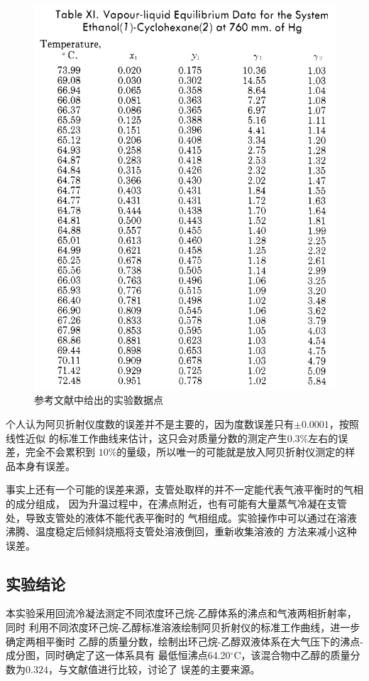 \documentclass[12pt]{article}
\newcommand{\mr}[1]{\mathrm{#1}}
\def\celsius{^{\circ}\mr{C}}  %
\begin{document}
		\begin{figure}
			\centering
			\includegraphics[scale=0.5]{phase_data_paper.png}
			\caption{参考文献\citealt{doi:10.1021/je60019a024}中给出的实验数据点}
			\label{phase data paper}
		\end{figure}
		\par 
		个人认为阿贝折射仪度数的误差并不是主要的，因为度数误差只有$\pm0.0001$，按照线性近似
		的标准工作曲线来估计，这只会对质量分数的测定产生$0.3\%$左右的误差，完全不会累积到
		$10\%$的量级，所以唯一的可能就是放入阿贝折射仪测定的样品本身有误差。
		\par 
		事实上还有一个可能的误差来源，支管处取样的并不一定能代表气液平衡时的气相的成分组成，
		因为升温过程中，在沸点附近，也有可能有大量蒸气冷凝在支管处，导致支管处的液体不能代表平衡时的
		气相组成。实验操作中可以通过在溶液沸腾、温度稳定后倾斜烧瓶将支管处溶液倒回，重新收集溶液的
		方法来减小这种误差。
		\subsection{实验结论}
		本实验采用回流冷凝法测定不同浓度环己烷-乙醇体系的沸点和气液两相折射率，同时
		利用不同浓度环己烷-乙醇标准溶液绘制阿贝折射仪的标准工作曲线，进一步确定两相平衡时
		乙醇的质量分数，绘制出环己烷-乙醇双液体系在大气压下的沸点-成分图，同时确定了这一体系具有
		最低恒沸点64.20$\celsius$，该混合物中乙醇的质量分数为$0.324$，与文献值进行比较，讨论了
		误差的主要来源。
	\vbox{}
	
	
\end{document}

